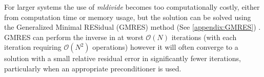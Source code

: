 For larger systems the use of \textit{mldivide} becomes too computationally costly, either from computation time or memory usage, but the solution can be solved using the Generalized Minimal RESidual (GMRES) method (See \cref{appendix:GMRES}) \cite{Saad1986GMRES:Systems,Elman2005FiniteDynamics}. GMRES can perform the inverse in at worst $\mathcal{O}(N)$ iterations (with each iteration requiring $\mathcal{O}(N^2)$ operations) however it will often converge to a solution with a small relative residual error in significantly fewer iterations, particularly when an appropriate preconditioner is used. 